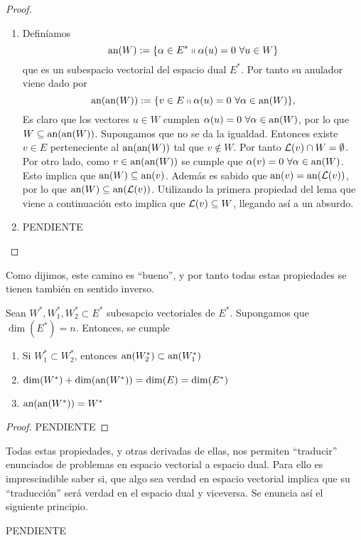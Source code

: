 \begin{proof}
\begin{enumerate}
		\item Definíamos 
		\begin{equation*}
			\text{an}(W):=\{\alpha\in E^*\shortparallel \alpha(u)=0 \ \forall u\in W\}
		\end{equation*}
		que es un subespacio vectorial del espacio dual $E^*$. Por tanto su anulador viene dado por
		\begin{equation*}
		\text{an}(\text{an}(W)):=\{v\in E\shortparallel \alpha(u)=0 \ \forall \alpha\in \text{an}(W)\},
		\end{equation*}
		Es claro que los vectores $u\in W$ cumplen $\alpha(u)=0 \ \forall \alpha\in \text{an}(W)$, por lo que $W\subseteq \text{an}(\text{an}(W))$. Supongamos que no se da la igualdad. Entonces existe $v\in E$ perteneciente al $\text{an}(\text{an}(W))$ tal que $v\not\in W$. Por tanto $\mathcal{L}(v)\cap W=\emptyset$. Por otro lado, como $v\in \text{an}(\text{an}(W))$ se cumple que $\alpha(v)=0 \ \forall \alpha\in \text{an}(W)$. Esto implica que $\text{an}(W)\subseteq \text{an}(v)$. Además es sabido que $\text{an}(v)=\text{an}(\mathcal{L}(v))$, por lo que $\text{an}(W)\subseteq \text{an}(\mathcal{L}(v))$. Utilizando la primera propiedad del lema que viene a continuación esto implica que $\mathcal{L}(v)\subseteq W$, llegando así a un absurdo.
		
		\item PENDIENTE
	\end{enumerate}
\end{proof}
Como dijimos, este camino es ``bueno'', y por tanto todas estas propiedades se tienen también en sentido inverso.
\begin{lem}
	Sean $W^*,W_1^*,W_2^*\subset E^*$ subesapcio vectoriales de $E^*$. Supongamos que $\dim(E^*)=n$. Entonces, se cumple
	\begin{enumerate}
		\item Si $W_1^*\subset W_2^*$, entonces $\text{an}(W_2^*)\subset \text{an}(W_1^*)$
		
		\item $\dim(W^*)+\dim(\text{an}(W^*))=\dim(E)=\dim(E^*)$
		
		\item $\text{an}(\text{an}(W^*))=W^*$
	\end{enumerate}
\end{lem}
\begin{proof}
	PENDIENTE
\end{proof}
Todas estas propiedades, y otras derivadas de ellas, nos permiten ``traducir'' enunciados de problemas en espacio vectorial a espacio dual. Para ello es imprescindible saber si, que algo sea verdad en espacio vectorial implica que su ``traducción'' será verdad en el espacio dual y viceversa. Se enuncia así el siguiente principio.
\begin{prop}
	PENDIENTE
\end{prop}
